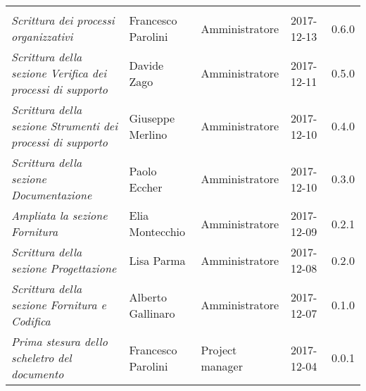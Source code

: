 \newpage 
\section*{}
\begin{table}[H]
	\centering
	\begin{tabular}{p{4cm}|C{3cm}|C{3cm}|R{2.5cm}|R{2cm}}
		
		 & & & & \\
		
		
		\emph{Scrittura dei processi organizzativi} & Francesco Parolini & Amministratore & 2017-12-13 & 0.6.0 \\
		\hline
		
		\emph{Scrittura della sezione Verifica dei processi di supporto} & Davide Zago & Amministratore & 2017-12-11 & 0.5.0 \\
		\hline
		
		\emph{Scrittura della sezione Strumenti dei processi di supporto} & Giuseppe Merlino & Amministratore & 2017-12-10 & 0.4.0 \\
		\hline
		
		\emph{Scrittura della sezione Documentazione}& Paolo Eccher & Amministratore & 2017-12-10 & 0.3.0 \\
		\hline
		
		\emph{Ampliata la sezione Fornitura}& Elia Montecchio & Amministratore & 2017-12-09 & 0.2.1 \\
		\hline
		
		\emph{Scrittura della sezione Progettazione} & Lisa Parma & Amministratore & 2017-12-08 & 0.2.0 \\
		\hline
		
				
		\emph{Scrittura della sezione Fornitura e Codifica} & Alberto Gallinaro & Amministratore & 2017-12-07 & 0.1.0 \\
		\hline
		
		\emph{Prima stesura dello scheletro del documento} & Francesco Parolini & Project manager & 2017-12-04 & 0.0.1 \\
	

	\end{tabular}
	
\end{table}


\clearpage